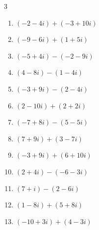 \begin{multicols}{3}
\begin{enumerate}
        \phantom{$\displaystyle =16-14i$}

  \item $\displaystyle (-2-4i) + (-3+10i)$

        \phantom{$\displaystyle =-5+6i$}

  \item $\displaystyle (-9-6i) + (1+5i)$

        \phantom{$\displaystyle =-8-i$}

  \item $\displaystyle (-5+4i) - (-2-9i)$

        \phantom{$\displaystyle =-3+13i$}

  \item $\displaystyle (4-8i) - (1-4i)$

        \phantom{$\displaystyle =3-4i$}

  \item $\displaystyle (-3+9i) - (2-4i)$

        \phantom{$\displaystyle =-5+13i$}

  \item $\displaystyle (2-10i) + (2+2i)$

        \phantom{$\displaystyle =4-8i$}

  \item $\displaystyle (-7+8i) - (5-5i)$

        \phantom{$\displaystyle =-12+13i$}

  \item $\displaystyle (7+9i) + (3-7i)$

        \phantom{$\displaystyle =10+2i$}

  \item $\displaystyle (-3+9i) + (6+10i)$

        \phantom{$\displaystyle =3+19i$}

  \item $\displaystyle (2+4i) - (-6-3i)$

        \phantom{$\displaystyle =8+7i$}

  \item $\displaystyle (7+i) - (2-6i)$

        \phantom{$\displaystyle =5+7i$}

  \item $\displaystyle (1-8i) + (5+8i)$

        \phantom{$\displaystyle =6$}

  \item $\displaystyle (-10+3i) + (4-3i)$


\end{enumerate}
\end{multicols}
